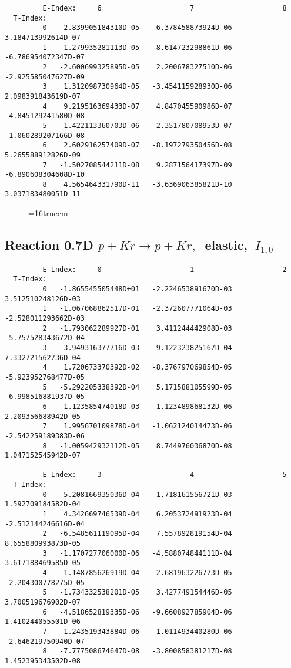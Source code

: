 \documentclass[12pt,dvipdfmx]{article}
\begin{document}
{\begin{small}
\begin{verbatim}
         E-Index:     6                     7                     8
  T-Index:
         0    2.839905184310D-05   -6.378458873924D-06    3.184713992614D-07
         1   -1.279935281113D-05    8.614723298861D-06   -6.786954072347D-07
         2   -2.600699325895D-05    2.200678327510D-06   -2.925585047627D-09
         3    1.312098730964D-05   -3.454115928930D-06    2.098391843619D-07
         4    9.219516369433D-07    4.847045590986D-07   -4.845129241580D-08
         5   -1.422113360703D-06    2.351780708953D-07   -1.060289207166D-08
         6    2.602916257409D-07   -8.197279350456D-08    5.265588912826D-09
         7   -1.502708544211D-08    9.287156417397D-09   -6.890608304608D-10
         8    4.565464331790D-11   -3.636906385821D-10    3.037183480051D-11
\end{verbatim}\end{small}


\begin{figure} \label{0.7T}
\epsfxsize=16truecm
\end{figure}
\newpage

\subsection{
Reaction 0.7D  $p + Kr \rightarrow p + Kr ,\ $
 elastic, $\  I_{1,0}$
}

\begin{small}\begin{verbatim}
         E-Index:     0                     1                     2
  T-Index:
         0   -1.865545505448D+01   -2.224653891670D-03    3.512510248126D-03
         1   -1.067068862517D-01   -2.372607771064D-03   -2.528011293662D-03
         2   -1.793062289927D-01    3.411244442908D-03   -5.757528343672D-04
         3   -3.949316377716D-03   -9.122323825167D-04    7.332721562736D-04
         4    1.720673370392D-02   -8.376797069854D-05   -5.923952768477D-05
         5   -5.292205338392D-04    5.171588105599D-05   -6.998516881937D-05
         6   -1.123585474018D-03   -1.123489868132D-06    2.209356688942D-05
         7    1.995670109878D-04   -1.062124014473D-06   -2.542259189383D-06
         8   -1.005942932112D-05    8.744976036870D-08    1.047152545942D-07

         E-Index:     3                     4                     5
  T-Index:
         0    5.208166935036D-04   -1.718161556721D-03    1.592709184582D-04
         1    4.342669746539D-04    6.205372491923D-04   -2.512144246616D-04
         2   -6.548561119095D-04    7.557892819154D-04    8.655880993873D-05
         3   -1.170727706000D-06   -4.588074844111D-04    3.617188469585D-05
         4    1.148785626919D-04    2.681963226773D-05   -2.204300778275D-05
         5   -1.734332538201D-05    3.427749154446D-05    3.700519676902D-07
         6   -4.518652819335D-06   -9.660892785904D-06    1.410244055501D-06
         7    1.243519343884D-06    1.011493440280D-06   -2.646219750940D-07
         8   -7.777508674647D-08   -3.800858381217D-08    1.452395343502D-08


\end{verbatim}
\end{small}}
\end{document}
